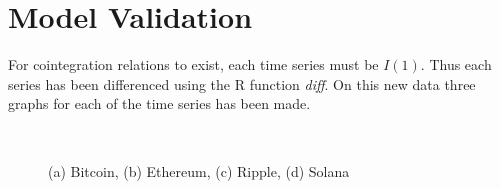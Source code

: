 \section{Model Validation}
For cointegration relations to exist, each time series must be $I(1)$. Thus each series has been differenced using the R function \textit{diff}. On this new data three graphs for each of the time series has been made. 
\begin{figure}[H]
  \centering
  \quad
  \\
  \quad
  \caption{(a) Bitcoin, (b) Ethereum, (c) Ripple, (d) Solana }
\end{figure}
